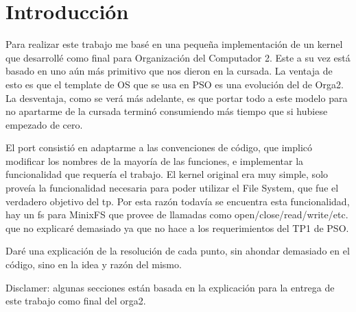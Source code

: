 \section{Introducción}

Para realizar este trabajo me basé en una pequeña implementación de un kernel
que desarrollé como final para Organización del Computador 2. Este a su vez
está basado en uno aún más primitivo que nos dieron en la cursada. La ventaja
de esto es que el template de OS que se usa en PSO es una evolución del de
Orga2. La desventaja, como se verá más adelante, es que portar todo a este
modelo para no apartarme de la cursada terminó consumiendo más tiempo que si
hubiese empezado de cero.

El port consistió en adaptarme a las convenciones de código, que implicó
modificar los nombres de la mayoría de las funciones, e implementar la
funcionalidad que requería el trabajo. El kernel original era muy simple, solo
proveía la funcionalidad necesaria para poder utilizar el File System, que fue
el verdadero objetivo del tp. Por esta razón todavía se encuentra esta
funcionalidad, hay un fs para MinixFS que provee de llamadas como
open/close/read/write/etc. que no explicaré demasiado ya que no hace a los
requerimientos del TP1 de PSO.

Daré una explicación de la resolución de cada punto, sin ahondar demasiado en
el código, sino en la idea y razón del mismo.

Disclamer: algunas secciones están basada en la explicación para la entrega de
este trabajo como final del orga2.

